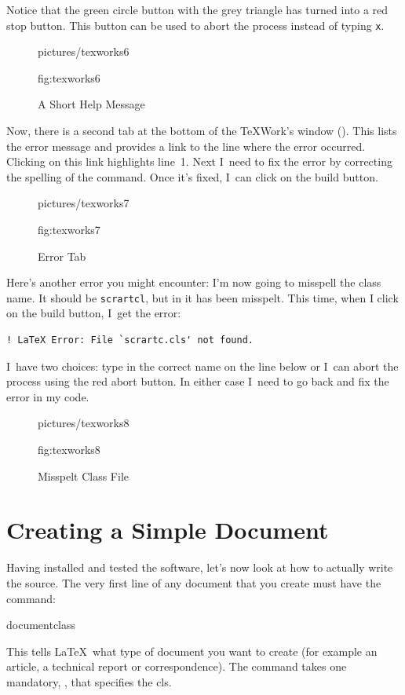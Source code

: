 Notice that the green circle button with the grey triangle has turned
into a red stop button. This button can be used to abort the
process instead of typing \texttt{x}.

\begin{figure}[htbp]
\figconts
  {pictures/texworks6}
  {%
    \caption{A Short Help Message}%
  }%
  {fig:texworks6}
\end{figure}

Now, there is a second tab at the bottom of the TeXWork's window
(). This lists the error message and
provides a link to the line where the error occurred. Clicking on
this link highlights line~1. Next I~need to fix the error by
correcting the spelling of the command. Once it's fixed, I~can click
on the build button.

\begin{figure}[htbp]
\figconts
  {pictures/texworks7}
  {%
    \caption{Error Tab}%
  }%
  {fig:texworks7}
\end{figure}

Here's another error you might encounter: I'm now going to misspell
the class name. It should be \texttt{scrartcl}, but in
 it has been misspelt. This time, when I
click on the build button, I~get the error:
\begin{verbatim}
! LaTeX Error: File `scrartc.cls' not found.
\end{verbatim}
I~have two choices: type in the correct name on the line below
 or I~can abort the process using the red abort
button. In either case I~need to go back and fix the error in my
code.

\begin{figure}[htbp]
\figconts
  {pictures/texworks8}
  {%
   \caption{Misspelt Class File}%
  }%
  {fig:texworks8}
\end{figure}



\chapter{Creating a Simple Document}
\label{ch:simpledoc}

Having installed and tested the software, let's now look at how to
actually write the \gls{source}.  The very first line of any document that you create must have
the \gls{command}:
\begin{definition}
\gls{documentclass}
\end{definition}%
This tells \LaTeX\ what type of document you want to create
(for example an article, a technical report or correspondence).  The
 command takes one \gls{mandatory}, ,
that specifies the \gls{cls}.

